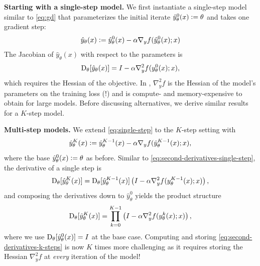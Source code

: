 \documentclass[twoside,11pt]{article}
\begin{document}
\textbf{Starting with a single-step model.}
We first instantiate a single-step model
similar to \cref{eq:gd} that parameterizes the initial
iterate $\hat y^0_\theta(x)\vcentcolon=\theta$ and takes one gradient step:
\begin{equation}
  \hat y_\theta(x)\vcentcolon= \hat y^0_\theta(x) - \alpha \nabla_y f(\hat y^0_\theta(x); x)
  \label{eq:single-step}
\end{equation}
The Jacobian of $\hat y_\theta(x)$ with respect to the parameters is
\begin{equation}
  \mathrm{D}_\theta[\hat y_\theta(x)] = I-\alpha \nabla_y^2 f(y_\theta^0(x); x),
  \label{eq:second-derivatives-single-step}
\end{equation}
which requires the Hessian of the objective.
In \citet{finn2017model}, $\nabla_y^2 f$ is the Hessian of the
model's parameters on the training loss (!) and is
compute- and memory-expensive to obtain for large models.
Before discussing alternatives, we derive similar results for
a $K$-step model.

\textbf{Multi-step models.}
We extend \cref{eq:single-step} to the $K$-step setting with
\begin{equation}
\hat y_\theta^K(x)\vcentcolon= \hat y^{K-1}_\theta(x) - \alpha\nabla_y f(\hat y^{K-1}_\theta(x); x),
\end{equation}
where the base $\hat y_\theta^0(x)\vcentcolon=\theta$ as before.
Similar to \cref{eq:second-derivatives-single-step},
the derivative of a single step is
\begin{equation}
  \mathrm{D}_\theta[\hat y_\theta^K(x)] = \mathrm{D}_\theta[\hat y_\theta^{K-1}(x)]\left(I-\alpha\nabla_y^2 f(y_\theta^{K-1}(x); x)\right),
  \label{eq:second-derivatives-recurrent}
\end{equation}
and composing the derivatives down to $\hat y_\theta^0$ yields the product structure
\begin{equation}
  \mathrm{D}_\theta[\hat y_\theta^K(x)] = \prod_{k=0}^{K-1} \left( I-\alpha\nabla_y^2 f(y_\theta^k(x); x) \right),
  \label{eq:second-derivatives-k-steps}
\end{equation}
where we use $\mathrm{D}_\theta[\hat y_\theta^0(x)]=I$ at the base case.
Computing and storing \cref{eq:second-derivatives-k-steps} is
now $K$ times more challenging as it requires storing the Hessian
$\nabla_y^2 f$ at \emph{every} iteration of the model!
\end{document}
